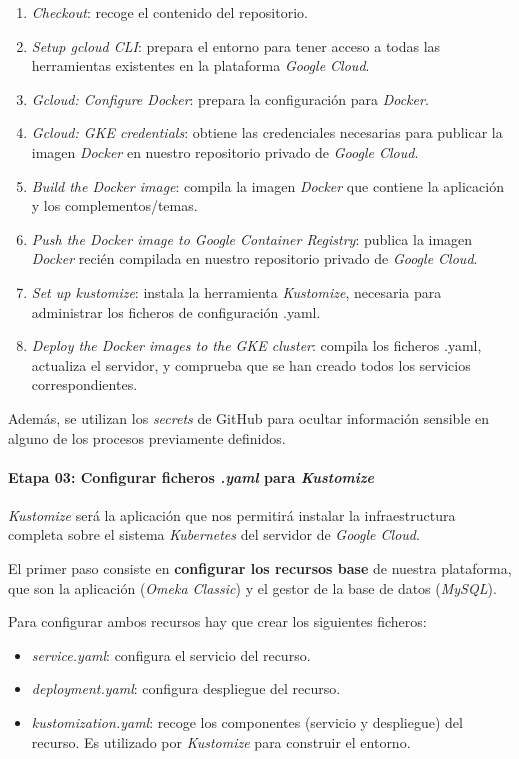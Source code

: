 \begin{enumerate}
\def\labelenumi{\arabic{enumi}.}
\tightlist
\item
  \emph{Checkout}: recoge el contenido del repositorio.
\item
  \emph{Setup gcloud CLI}: prepara el entorno para tener acceso a todas
  las herramientas existentes en la plataforma \emph{Google Cloud}.
\item
  \emph{Gcloud: Configure Docker}: prepara la configuración para
  \emph{Docker}.
\item
  \emph{Gcloud: GKE credentials}: obtiene las credenciales necesarias
  para publicar la imagen \emph{Docker} en nuestro repositorio privado
  de \emph{Google Cloud}.
\item
  \emph{Build the Docker image}: compila la imagen \emph{Docker} que
  contiene la aplicación y los complementos/temas.
\item
  \emph{Push the Docker image to Google Container Registry}: publica la
  imagen \emph{Docker} recién compilada en nuestro repositorio privado
  de \emph{Google Cloud}.
\item
  \emph{Set up kustomize}: instala la herramienta \emph{Kustomize},
  necesaria para administrar los ficheros de configuración .yaml.
\item
  \emph{Deploy the Docker images to the GKE cluster}: compila los
  ficheros .yaml, actualiza el servidor, y comprueba que se han creado
  todos los servicios correspondientes.
\end{enumerate}

Además, se utilizan los \emph{secrets} de GitHub para ocultar
información sensible en alguno de los procesos previamente definidos.

\paragraph{Etapa 03: Configurar ficheros \emph{.yaml} para \emph{Kustomize}} 
\emph{Kustomize} será la aplicación que nos permitirá instalar la
infraestructura completa sobre el sistema \emph{Kubernetes} del servidor
de \emph{Google Cloud}.

El primer paso consiste en \textbf{configurar los recursos base} de
nuestra plataforma, que son la aplicación (\emph{Omeka Classic}) y el
gestor de la base de datos (\emph{MySQL}).

Para configurar ambos recursos hay que crear los siguientes ficheros:

\begin{itemize}
\tightlist
\item
  \emph{service.yaml}: configura el servicio del recurso.
\item
  \emph{deployment.yaml}: configura despliegue del recurso.
\item
  \emph{kustomization.yaml}: recoge los componentes (servicio y
  despliegue) del recurso. Es utilizado por \emph{Kustomize} para
  construir el entorno.
\end{itemize}

